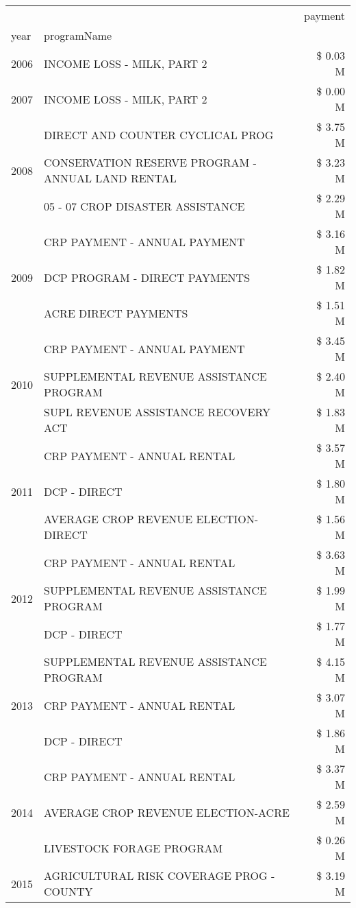 \begin{tabular}{llr}
\toprule
 &  & payment \\
year & programName &  \\
\midrule
2006 & INCOME LOSS - MILK, PART 2 & \$ 0.03 M \\
\cline{1-3}
2007 & INCOME LOSS - MILK, PART 2 & \$ 0.00 M \\
\cline{1-3}
\multirow[t]{3}{*}{2008} & DIRECT AND COUNTER CYCLICAL PROG & \$ 3.75 M \\
 & CONSERVATION RESERVE PROGRAM - ANNUAL LAND RENTAL & \$ 3.23 M \\
 & 05 - 07 CROP DISASTER ASSISTANCE & \$ 2.29 M \\
\cline{1-3}
\multirow[t]{3}{*}{2009} & CRP PAYMENT - ANNUAL PAYMENT & \$ 3.16 M \\
 & DCP PROGRAM - DIRECT PAYMENTS & \$ 1.82 M \\
 & ACRE DIRECT PAYMENTS & \$ 1.51 M \\
\cline{1-3}
\multirow[t]{3}{*}{2010} & CRP PAYMENT - ANNUAL PAYMENT & \$ 3.45 M \\
 & SUPPLEMENTAL REVENUE ASSISTANCE PROGRAM & \$ 2.40 M \\
 & SUPL REVENUE ASSISTANCE RECOVERY ACT & \$ 1.83 M \\
\cline{1-3}
\multirow[t]{3}{*}{2011} & CRP PAYMENT - ANNUAL RENTAL & \$ 3.57 M \\
 & DCP - DIRECT & \$ 1.80 M \\
 & AVERAGE CROP REVENUE ELECTION-DIRECT & \$ 1.56 M \\
\cline{1-3}
\multirow[t]{3}{*}{2012} & CRP PAYMENT - ANNUAL RENTAL & \$ 3.63 M \\
 & SUPPLEMENTAL REVENUE ASSISTANCE PROGRAM & \$ 1.99 M \\
 & DCP - DIRECT & \$ 1.77 M \\
\cline{1-3}
\multirow[t]{3}{*}{2013} & SUPPLEMENTAL REVENUE ASSISTANCE PROGRAM & \$ 4.15 M \\
 & CRP PAYMENT - ANNUAL RENTAL & \$ 3.07 M \\
 & DCP - DIRECT & \$ 1.86 M \\
\cline{1-3}
\multirow[t]{3}{*}{2014} & CRP PAYMENT - ANNUAL RENTAL & \$ 3.37 M \\
 & AVERAGE CROP REVENUE ELECTION-ACRE & \$ 2.59 M \\
 & LIVESTOCK FORAGE PROGRAM & \$ 0.26 M \\
\cline{1-3}
\multirow[t]{3}{*}{2015} & AGRICULTURAL RISK COVERAGE PROG - COUNTY & \$ 3.19 M \\

\end{tabular}
